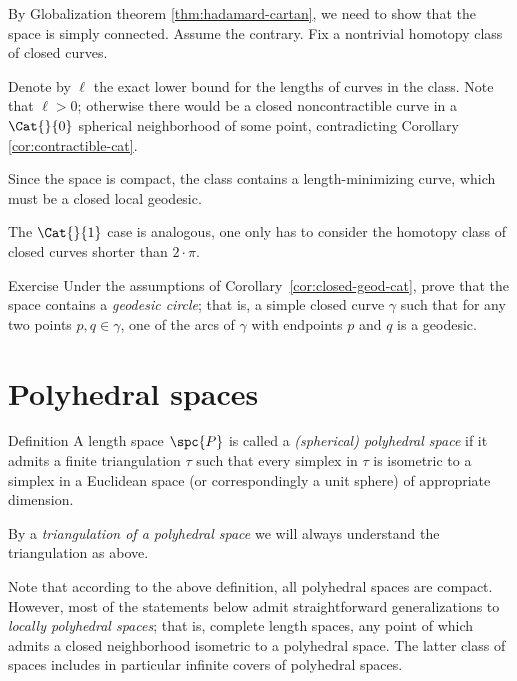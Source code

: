 By Globalization theorem \ref{thm:hadamard-cartan}, we need to show that the space is simply connected.
Assume the contrary. 
Fix a nontrivial homotopy class of closed curves.

Denote by $\ell$ the exact lower bound for the lengths of curves in the class.
Note that $\ell>0$;
otherwise there would be a closed noncontractible curve in a $\Cat{}{0}$ spherical neighborhood of some point, contradicting Corollary \ref{cor:contractible-cat}.

Since the space is compact, the class contains a length-minimizing curve, 
which must be a closed local geodesic. 

The $\Cat{}{1}$ case is analogous, one only has to consider the homotopy class of closed curves shorter than $2\cdot\pi$.
\qeds

\begin{thm}{Exercise}\label{ex:geod-circle}
Under the assumptions of Corollary~\ref{cor:closed-geod-cat},
prove that the space contains a \emph{geodesic circle}; 
that is, a simple closed curve $\gamma$ such that 
for any two points $p,q\in\gamma$, one of the arcs of $\gamma$ with endpoints $p$ and $q$ is a  geodesic. 
\end{thm}


\section{Polyhedral spaces}

\begin{thm}{Definition}\label{def:poly}
A length space $\spc{P}$ is called  
a \emph{(spherical) polyhedral space} 
if it admits a finite triangulation $\tau$ 
such that every simplex in $\tau$ is isometric to a simplex in a Euclidean space (or correspondingly a unit sphere) of appropriate dimension.

By a 
\emph{triangulation of a polyhedral space} 
we will always understand the triangulation as above. 
\end{thm}

Note that according to the above definition,
all polyhedral spaces are compact.
However, 
most of the statements below admit straightforward generalizations 
to \emph{locally polyhedral spaces};
that is, complete length spaces,  
any point of which admits a closed neighborhood isometric to a polyhedral space.
The latter class of spaces includes in particular infinite covers of polyhedral spaces.

